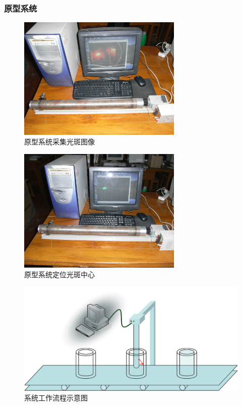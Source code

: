 \documentclass{beamer}
\begin{document}
\begin{frame}
  \frametitle{原型系统}
  \begin{overprint}
    \begin{figure}
    \center
    \includegraphics[width=0.7\textwidth]{image/systemworking1}
    \caption{\small 原型系统采集光斑图像}
    \end{figure}
    \begin{figure}
    \center
    \includegraphics[width=0.7\textwidth]{image/systemworking2}
    \caption{\small 原型系统定位光斑中心}
    \end{figure}
    \begin{figure}
    \center
    \includegraphics[width=\textwidth]{image/workingmodel}
    \caption{\small 系统工作流程示意图}
    \end{figure}
  \end{overprint}
\end{frame}
\end{document}
